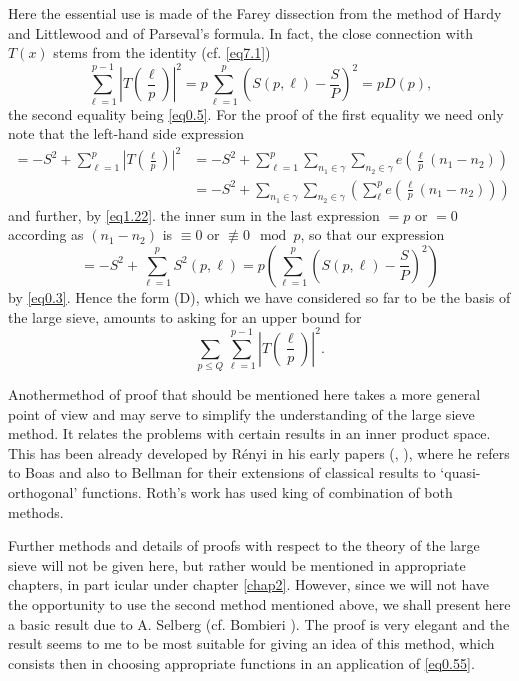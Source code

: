 Here the essential use is made of the Farey dissection from the method
of Hardy and Littlewood and of Parseval's formula. In fact, the close
connection with $T(x)$ stems from the identity (cf. \eqref{eq7.1}) 
\begin{equation*}
\sum^{p-1}_{\ell =1} |T (\frac{\ell} {p})|^2 = p \sum^p _{\ell =1}(S(p,
\ell)-\frac{S}{P})^2= p D (p),\tag{0.53} \label{eq0.53} 
\end{equation*}
the second equality being \eqref{eq0.5}. For the proof of the first
equality we need only note that the left-hand side expression 
\begin{align*}
=-S^2+ \sum _{\ell =1}^p | T(\frac{\ell}{p})|^2 & = -S^2+ \sum_{\ell =
1}^p \sum
_{n_{1}\in\gamma} \sum_{n_{2}\in \gamma}e(\frac{\ell}{p}(n_1-n_2))\\ 
&= -S^2 + \sum _{n_{1}\in \gamma }\sum_{n_{2}\in \gamma} ( \sum^{p}_{\ell}e (\frac {\ell}{p}(n_1-n_2)))
\end{align*}
and further, by \eqref{eq1.22}. the inner sum in the last expression
$= p$ or $= 0$ according as $(n_1-n_2)$ is $\equiv 0$ or $\nequiv 0
\mod p$, so that our expression 
$$
=-S^2 + \sum _{\ell =1}^p S^2 (p,\ell ) = p(\sum _{\ell =1}^p
(S(p,\ell )- \frac{S}{P})^2) 
$$
by \eqref{eq0.3}. Hence the form (D), which we have considered so far
to be the basis  of the large sieve, amounts to asking for an upper
bound for  
\begin{equation*}
 \sum_{p \leq Q}\sum_{\ell =1}^{p-1} |
 T(\frac{\ell}{p})|^2.\tag{0.54}\label{eq0.54}  
\end{equation*}

Another\pageoriginale method of proof that should be mentioned here
takes a more 
general point of view and may serve to simplify the understanding of
the large sieve method. It relates the problems with certain results
in an inner product space. This has been already developed by R\'enyi in
his early papers (\cite{key4}, \cite{key7}), where he refers to Boas
\cite{key1} and also 
to Bellman \cite{key1}  for their extensions of classical results to
`quasi-orthogonal' functions. Roth's work \cite{key2} has used king of
combination of both methods. 

Further methods and details of proofs with respect to the theory of
the large  sieve will not be given here, but rather would  be
mentioned in appropriate chapters, in part icular under chapter
\ref{chap2}. However, since we will not have the opportunity to use the second
method mentioned above, we shall present here a basic result due to
A. Selberg (cf. Bombieri \cite{key4}). The proof is very elegant and the
result seems to me to be most suitable for giving an idea of this
method, which consists then in choosing appropriate functions in an
application of \eqref{eq0.55}.  

